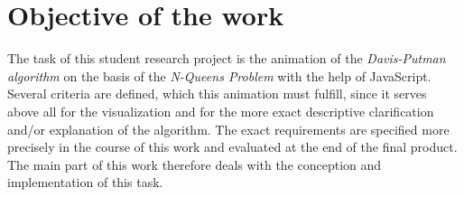 \section{Objective of the work}
\label{sec:introObjective}
The task of this student research project is the animation of the \textit{Davis-Putman algorithm} on the basis of the \textit{N-Queens Problem} with the help of JavaScript. Several criteria are defined, which this animation must fulfill, since it serves above all for the visualization and for the more exact descriptive clarification and/or explanation of the algorithm. The exact requirements are specified more precisely in the course of this work and evaluated at the end of the final product. The main part of this work therefore deals with the conception and implementation of this task.

